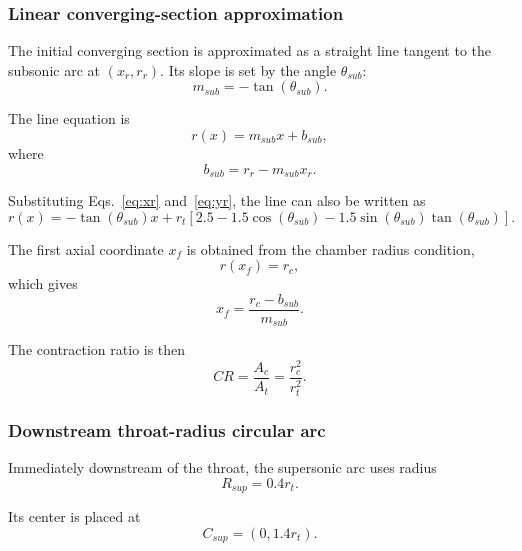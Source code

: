 \subsubsection{Linear converging-section approximation}

The initial converging section is approximated as a straight line tangent to the subsonic arc at $(x_r,r_r)$. Its slope is set by the angle $\theta_{sub}$:
\begin{equation}
m_{sub}=-\tan(\theta_{sub}).
\end{equation}

The line equation is
\begin{equation}
r(x)=m_{sub}x+b_{sub},
\end{equation}
where
\begin{equation}
b_{sub}=r_r-m_{sub}x_r.
\end{equation}

Substituting Eqs.~\eqref{eq:xr} and~\eqref{eq:yr}, the line can also be written as
\begin{equation}
r(x)=-\tan(\theta_{sub})x
+r_t\left[2.5-1.5\cos(\theta_{sub})-1.5\sin(\theta_{sub})\tan(\theta_{sub})\right].
\label{eq:line_expanded}
\end{equation}

The first axial coordinate $x_f$ is obtained from the chamber radius condition,
\begin{equation}
r(x_f)=r_c,
\end{equation}
which gives
\begin{equation}
x_f=\frac{r_c-b_{sub}}{m_{sub}} .
\label{eq:xf}
\end{equation}

The contraction ratio is then
\begin{equation}
CR=\frac{A_c}{A_t}=\frac{r_c^2}{r_t^2}.
\label{eq:contraction_ratio}
\end{equation}

\subsubsection{Downstream throat-radius circular arc}

Immediately downstream of the throat, the supersonic arc uses radius
\begin{equation}
R_{sup}=0.4r_t.
\end{equation}

Its center is placed at
\begin{equation}
C_{sup}=(0,1.4r_t).
\end{equation}

